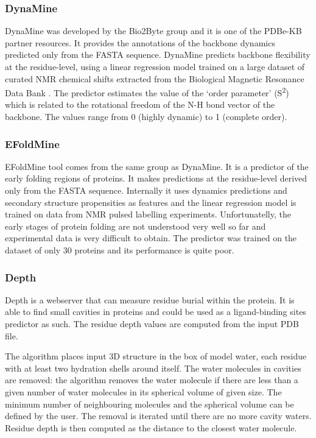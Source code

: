 \subsubsection{DynaMine}
DynaMine \cite{dynamine} was developed by the Bio2Byte group \cite{bio2byte} and it is one of the PDBe-KB partner resources. It provides the annotations of the backbone dynamics predicted only from the FASTA sequence. DynaMine predicts backbone flexibility at the residue-level, using a linear regression model trained on a large dataset of curated NMR chemical shifts extracted from the Biological Magnetic Resonance Data Bank \cite{bmrb}. The predictor estimates the value of the `order parameter' (S\textsuperscript{2}) which is related to the rotational freedom of the N-H bond vector of the backbone. The values range from 0 (highly dynamic) to 1 (complete order).

\subsubsection{EFoldMine}
EFoldMine \cite{efoldmine} tool comes from the same group as DynaMine. It is a predictor of the early folding regions of proteins. It makes predictions at the residue-level derived only from the FASTA sequence. Internally it uses dynamics predictions and secondary structure propensities as features and the linear regression model is trained on data from NMR pulsed labelling experiments. Unfortunatelly, the early stages of protein folding are not understood very well so far and experimental data is very difficult to obtain. The predictor was trained on the dataset of only 30 proteins and its performance is quite poor.

\subsubsection{Depth}
Depth \cite{depth} is a webserver that can measure residue burial within the protein. It is able to find small cavities in proteins and could be used as a ligand-binding sites predictor as such. The residue depth values are computed from the input PDB file.

The algorithm places input 3D structure in the box of model water, each residue with at least two hydration shells around itself. The water molecules in cavities are removed: the algorithm removes the water molecule if there are less than a given number of water molecules in its spherical volume of given size. The minimum number of neighbouring molecules and the spherical volume can be defined by the user. The removal is iterated until there are no more cavity waters. Residue depth is then computed as the distance to the closest water molecule.


